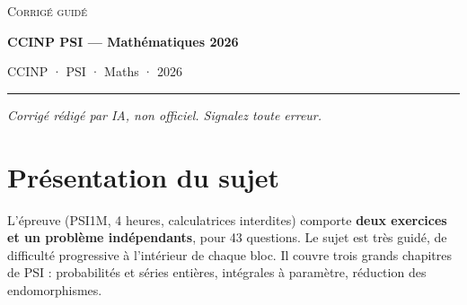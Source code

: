 \documentclass[11pt,a4paper]{article}
\begin{document}
\thispagestyle{plain}
\begin{center}
  {\small\scshape Corrigé guidé}\par\smallskip
  {\LARGE\bfseries CCINP PSI — Mathématiques 2026\par}\medskip
  {\large CCINP · PSI · Maths · 2026\par}
\end{center}
\vspace{2pt}\hrule\vspace{8pt}

\emph{Corrigé rédigé par IA, non officiel. Signalez toute erreur.}

\hypertarget{pruxe9sentation-du-sujet}{%
\section{Présentation du sujet}\label{pruxe9sentation-du-sujet}}

L'épreuve (PSI1M, 4 heures, calculatrices interdites) comporte \textbf{deux exercices et un problème indépendants}, pour 43 questions. Le sujet est très guidé, de difficulté progressive à l'intérieur de chaque bloc. Il couvre trois grands chapitres de PSI : probabilités et séries entières, intégrales à paramètre, réduction des endomorphismes.
\end{document}
